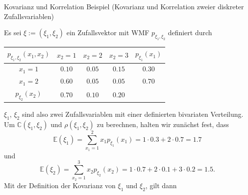 \documentclass[
  8pt,
  ignorenonframetext,
]{beamer}
\begin{document}
\begin{frame}{Kovarianz und Korrelation}
\protect\hypertarget{kovarianz-und-korrelation-1}{}
Beispiel (Kovarianz und Korrelation zweier diskreter Zufallsvariablen)
\vspace{1mm}

\footnotesize

Es sei \(\xi := (\xi_1,\xi_2)\) ein Zufallsvektor mit WMF
\(p_{\xi_1,\xi_2}\) definiert durch

\center
\renewcommand{\arraystretch}{1.4}
\begin{tabular}{c|ccc|c}
$p_{\xi_1,\xi_2}(x_1,x_2)$  &   $x_2 = 1$   &   $x_2 = 2$   &   $x_2 = 3$   &   $p_{\xi_1}(x_1)$        \\\hline
$x_1 = 1$               &   $0.10$      &   $0.05$      &   $0.15$      &   $0.30$              \\
$x_1 = 2$               &   $0.60$      &   $0.05$      &   $0.05$      &   $0.70$              \\\hline
$p_{\xi_2}(x_2)$    &   $0.70$      &   $0.10$      &   $0.20$      &                       \\
\end{tabular}
\vspace{1mm}

\flushleft

\(\xi_1\), \(\xi_2\) sind also zwei Zufallsvariablen mit einer
definierten bivariaten Verteilung. Um \(\mathbb{C}(\xi_1,\xi_2)\) und
\(\rho(\xi_1,\xi_2)\) zu berechnen, halten wir zunächst fest, dass
\begin{equation}
\mathbb{E}(\xi_1) = \sum_{x_1=1}^2 x_1 p_{\xi_1}(x_1) = 1\cdot 0.3 + 2\cdot 0.7 = 1.7
\end{equation} und \begin{equation}
\mathbb{E}(\xi_2) = \sum_{x_2=1}^3 x_2 p_{\xi_2}(x_2) = 1\cdot 0.7 + 2\cdot 0.1 + 3\cdot 0.2 = 1.5.
\end{equation} Mit der Definition der Kovarianz von \(\xi_1\) und
\(\xi_2\), gilt dann
\end{frame}
\end{document}
